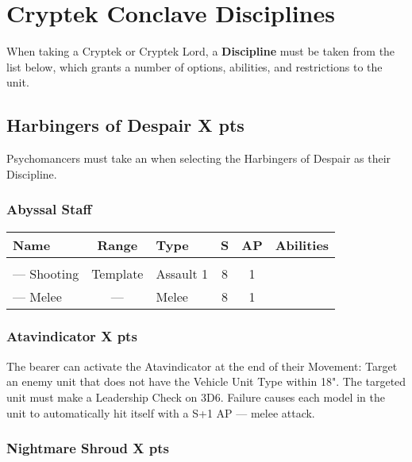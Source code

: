 \section{Cryptek Conclave Disciplines} \label{Cryptek Conclave Discipline}

When taking a Cryptek or Cryptek Lord, a \textbf{Discipline} must be taken from the list below, which grants a number of options, abilities, and restrictions to the unit.

\subsection[Harbingers of Despair ]{Harbingers of Despair  \hrulefill X pts}

Psychomancers must take an  when selecting the Harbingers of Despair as their Discipline.

\subsubsection{Abyssal Staff}

\label{Abyssal Staff}
\noindent
\begin{NiceTabular}{L{115 pt} c C{40pt} *{2}{c} >{\raggedright\arraybackslash}p{240pt}}
	Name & Range & Type & S & AP & Abilities \\
	\hline
	 &  &  &  &  & \\
	— Shooting & Template & Assault 1 & 8 & 1 &  \\
	— Melee & — & Melee & 8 & 1 &  \\
\end{NiceTabular}

\subsubsection[Atavindicator ]{Atavindicator  \hrulefill X pts}

The bearer can activate the Atavindicator at the end of their Movement: Target an enemy unit that does not have the Vehicle Unit Type within 18". The targeted unit must make a Leadership Check on 3D6. Failure causes each model in the unit to automatically hit itself with a S+1 AP — melee attack.

\subsubsection[Nightmare Shroud ]{Nightmare Shroud  \hrulefill X pts} 

